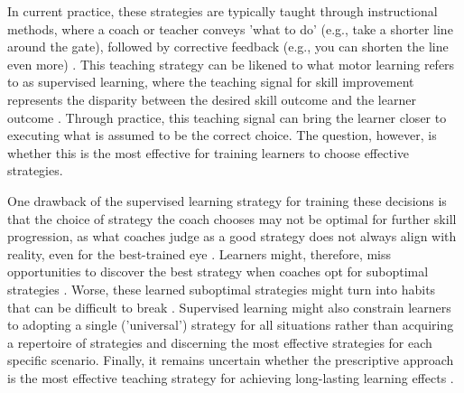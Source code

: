 \documentclass[pdflatex,sn-nature]{sn-jnl}%
\theoremstyle{thmstyleone}%
\theoremstyle{thmstyletwo}%
\theoremstyle{thmstylethree}%
\begin{document}
In current practice, these strategies are typically taught through instructional methods, where a coach or teacher conveys 'what to do' (e.g., take a shorter line around the gate), followed by corrective feedback (e.g., you can shorten the line even more) \cite{williams_practice_2005, williams_effective_2023, hodges_role_1999}. This teaching strategy can be likened to what motor learning refers to as supervised learning, where the teaching signal for skill improvement represents the disparity between the desired skill outcome and the learner outcome \cite{jordan_forward_1992, wolpert_motor_2010, doya_complementary_2000}. Through practice, this teaching signal can bring the learner closer to executing what is assumed to be the correct choice. The question, however, is whether this is the most effective for training learners to choose effective strategies. 

One drawback of the supervised learning strategy for training these decisions is that the choice of strategy the coach chooses may not be optimal for further skill progression, as what coaches judge as a good strategy does not always align with reality, even for the best-trained eye \cite{supej_impact_2019, cochrum_visual_2021}. Learners might, therefore, miss opportunities to discover the best strategy when coaches opt for suboptimal strategies \cite{gray_plateaus_2017}. Worse, these learned suboptimal strategies might turn into habits that can be difficult to break \cite{popp_effect_2020}. Supervised learning might also constrain learners to adopting a single ('universal') strategy for all situations rather than acquiring a repertoire of strategies and discerning the most effective strategies for each specific scenario. Finally, it remains uncertain whether the prescriptive approach is the most effective teaching strategy for achieving long-lasting learning effects \cite{wulf_instructions_1997, hodges_role_1999, williams_practice_2005,williams_effective_2023}.
\end{document}
